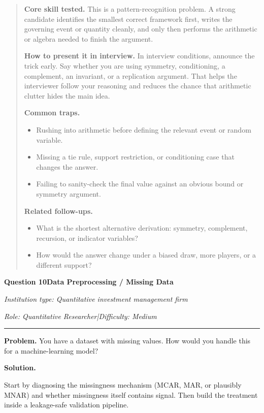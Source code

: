 \documentclass[11pt,letterpaper,openany]{book}
\newenvironment{EditorialNote}
  {\begin{quote}\small\setlength{\parskip}{0.25em}}
  {\end{quote}}
\newcommand{\QuestionSpacer}{\vspace{0.4em}}
\newcommand{\InterviewQuestionHeader}[5]{%
  \vspace{1.0em}%
  {\large\bfseries #1\enspace #4\par}%
  {\small\itshape Institution type: #2\par}%
  {\small\itshape Role: #3\enspace |\enspace Difficulty: #5\par}%
  \vspace{0.25em}\hrule\vspace{0.45em}%
}
\begin{document}
\begin{EditorialNote}


\textbf{Core skill tested.} This is a pattern-recognition problem. A strong candidate identifies the smallest correct framework first, writes the governing event or quantity cleanly, and only then performs the arithmetic or algebra needed to finish the argument.

\textbf{How to present it in interview.} In interview conditions, announce the trick early. Say whether you are using symmetry, conditioning, a complement, an invariant, or a replication argument. That helps the interviewer follow your reasoning and reduces the chance that arithmetic clutter hides the main idea.

\textbf{Common traps.}
\begin{itemize}
\item Rushing into arithmetic before defining the relevant event or random variable.
\item Missing a tie rule, support restriction, or conditioning case that changes the answer.
\item Failing to sanity-check the final value against an obvious bound or symmetry argument.
\end{itemize}

\textbf{Related follow-ups.}
\begin{itemize}
\item What is the shortest alternative derivation: symmetry, complement, recursion, or indicator variables?
\item How would the answer change under a biased draw, more players, or a different support?
\end{itemize}


\end{EditorialNote}
\QuestionSpacer

\InterviewQuestionHeader{Question 10}{Quantitative investment management firm}{Quantitative Researcher}{Data Preprocessing / Missing Data}{Medium}
\textbf{Problem.} You have a dataset with missing values. How would you handle this for a machine-learning model?

\textbf{Solution.}


Start by diagnosing the missingness mechanism (MCAR, MAR, or plausibly MNAR) and whether missingness itself contains signal. Then build the treatment inside a leakage-safe validation pipeline.
\end{document}
